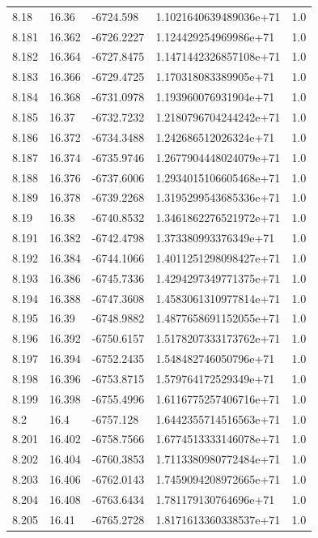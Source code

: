 \begin{tabular}{lllll}
8.18 & 16.36 & -6724.598 & 1.1021640639489036e+71 & 1.0 \\
8.181 & 16.362 & -6726.2227 & 1.124429254969986e+71 & 1.0 \\
8.182 & 16.364 & -6727.8475 & 1.1471442326857108e+71 & 1.0 \\
8.183 & 16.366 & -6729.4725 & 1.170318083389905e+71 & 1.0 \\
8.184 & 16.368 & -6731.0978 & 1.193960076931904e+71 & 1.0 \\
8.185 & 16.37 & -6732.7232 & 1.2180796704244242e+71 & 1.0 \\
8.186 & 16.372 & -6734.3488 & 1.242686512026324e+71 & 1.0 \\
8.187 & 16.374 & -6735.9746 & 1.2677904448024079e+71 & 1.0 \\
8.188 & 16.376 & -6737.6006 & 1.2934015106605468e+71 & 1.0 \\
8.189 & 16.378 & -6739.2268 & 1.3195299543685336e+71 & 1.0 \\
8.19 & 16.38 & -6740.8532 & 1.3461862276521972e+71 & 1.0 \\
8.191 & 16.382 & -6742.4798 & 1.373380993376349e+71 & 1.0 \\
8.192 & 16.384 & -6744.1066 & 1.4011251298098427e+71 & 1.0 \\
8.193 & 16.386 & -6745.7336 & 1.4294297349771375e+71 & 1.0 \\
8.194 & 16.388 & -6747.3608 & 1.4583061310977814e+71 & 1.0 \\
8.195 & 16.39 & -6748.9882 & 1.4877658691152055e+71 & 1.0 \\
8.196 & 16.392 & -6750.6157 & 1.5178207333173762e+71 & 1.0 \\
8.197 & 16.394 & -6752.2435 & 1.548482746050796e+71 & 1.0 \\
8.198 & 16.396 & -6753.8715 & 1.579764172529349e+71 & 1.0 \\
8.199 & 16.398 & -6755.4996 & 1.6116775257406716e+71 & 1.0 \\
8.2 & 16.4 & -6757.128 & 1.6442355714516563e+71 & 1.0 \\
8.201 & 16.402 & -6758.7566 & 1.6774513333146078e+71 & 1.0 \\
8.202 & 16.404 & -6760.3853 & 1.7113380980772484e+71 & 1.0 \\
8.203 & 16.406 & -6762.0143 & 1.7459094208972665e+71 & 1.0 \\
8.204 & 16.408 & -6763.6434 & 1.781179130764696e+71 & 1.0 \\
8.205 & 16.41 & -6765.2728 & 1.8171613360338537e+71 & 1.0 \\

\end{tabular}
